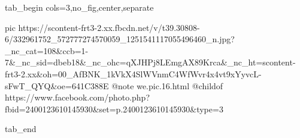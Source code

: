  
 
 
 
 


\ifcmt
  tab_begin cols=3,no_fig,center,separate

     pic https://scontent-frt3-2.xx.fbcdn.net/v/t39.30808-6/332961752_572777274570059_1251541117055496460_n.jpg?_nc_cat=108&ccb=1-7&_nc_sid=dbeb18&_nc_ohc=qXJHPj8LEmgAX89Krca&_nc_ht=scontent-frt3-2.xx&oh=00_AfBNK_1kVkX4SlWVnmC4WfWvr4x4vt9xYyvcL-sFwT_QYQ&oe=641C388E
		 @note we.pic.16.html
		 @childof https://www.facebook.com/photo.php?fbid=2400123610145930&set=p.2400123610145930&type=3

  tab_end
\fi
